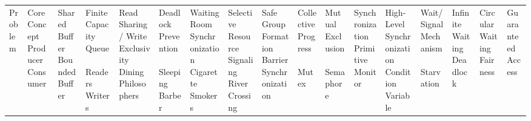 \begin{longtable}{|p{5cm}|p{8cm}|}
\hline
Problem & Core Concept \
\hline
Producer Consumer & Shared Buffer \
\hline
Bounded Buffer & Finite Capacity Queue \
\hline
Readers Writers & Read Sharing / Write Exclusivity \
\hline
Dining Philosophers & Deadlock Prevention \
\hline
Sleeping Barber & Waiting Room Synchronization \
\hline
Cigarette Smokers & Selective Resource Signaling \
\hline
River Crossing & Safe Group Formation \
\hline
Barrier Synchronization & Collective Progress \
\hline
Mutex & Mutual Exclusion \
\hline
Semaphore & Synchronization Primitive \
\hline
Monitor & High-Level Synchronization \
\hline
Condition Variable & Wait/Signal Mechanism \
\hline
Starvation & Infinite Waiting \
\hline
Deadlock & Circular Waiting \
\hline
Fairness & Guaranteed Access \
\hline
\end{longtable}
